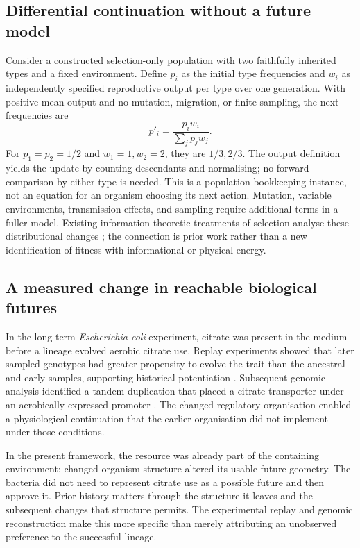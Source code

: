 \documentclass[11pt,a4paper]{article}
\theoremstyle{remark}
\begin{document}
\subsection{Differential continuation without a future model}

Consider a constructed selection-only population with two faithfully inherited
types and a fixed environment. Define \(p_i\) as the initial type frequencies
and \(w_i\) as independently specified reproductive output per type over one
generation. With positive mean output and no mutation, migration, or finite
sampling, the next frequencies are
\[
p'_i=\frac{p_iw_i}{\sum_j p_jw_j}.
\]
For \(p_1=p_2=1/2\) and \(w_1=1,w_2=2\), they are \(1/3,2/3\).
The output definition yields the update by counting descendants and
normalising; no forward comparison by either type is needed. This is a
population bookkeeping instance, not an equation for an organism choosing
its next action. Mutation, variable environments, transmission effects,
and sampling require additional terms in a fuller model. Existing
information-theoretic treatments of selection analyse these distributional
changes \citep{frank2012}; the connection is prior work rather than a new
identification of fitness with informational or physical energy.

\subsection{A measured change in reachable biological futures}

In the long-term \emph{Escherichia coli} experiment, citrate was present in the
medium before a lineage evolved aerobic citrate use. Replay experiments
showed that later sampled genotypes had greater propensity to evolve the
trait than the ancestral and early samples, supporting historical
potentiation \citep{blount2008}. Subsequent genomic analysis identified a
tandem duplication that placed a citrate transporter under an aerobically
expressed promoter \citep{blount2012}. The changed regulatory organisation
enabled a physiological continuation that the earlier organisation did not
implement under those conditions.

In the present framework, the resource was already part of the containing
environment; changed organism structure altered its usable future geometry.
The bacteria did not need to represent citrate use as a possible future and
then approve it. Prior history matters through the structure it leaves and
the subsequent changes that structure permits. The experimental replay and
genomic reconstruction make this more specific than merely attributing an
unobserved preference to the successful lineage.
\end{document}
